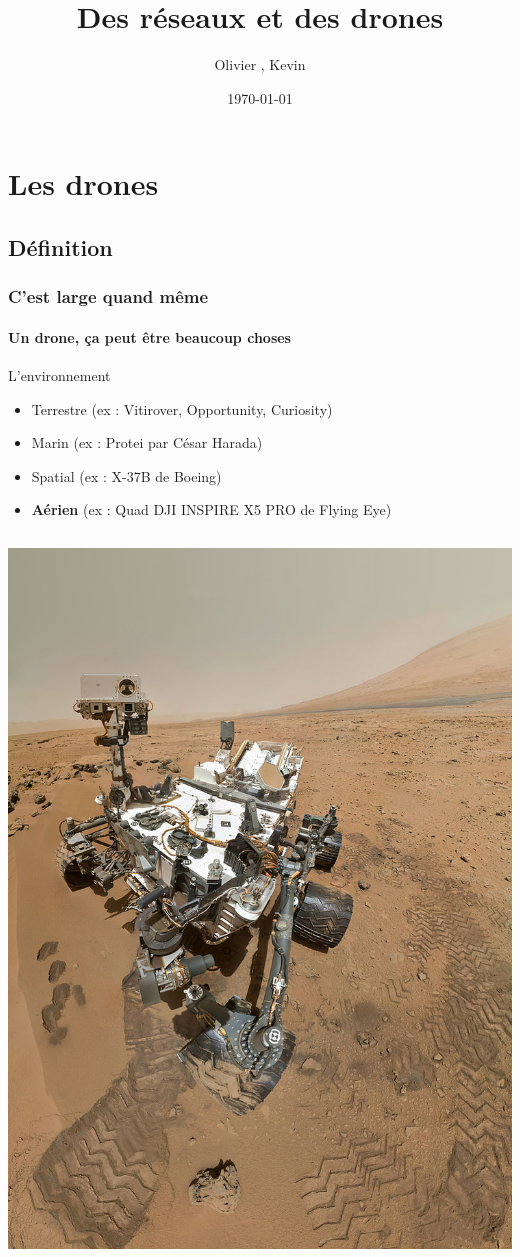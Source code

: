 \documentclass{beamer}
\title{Des réseaux et des drones}
\author{Olivier \bsc{Boissard}, Kevin \bsc{Boulala}}
\institute{Université de Franche Comté}
\date{\today}
\begin{document}
\begin{frame}
  \titlepage
\end{frame}

\begin{frame}
	\tableofcontents[]
\end{frame}

\section{Les drones}
\subsection{Définition}
\begin{frame}
  \frametitle{C'est large quand même}
  \framesubtitle{Un drone, ça peut être beaucoup choses}
  \begin{block}{L'environnement}
    \begin{itemize}
      \item Terrestre (ex : Vitirover, Opportunity, Curiosity)
      \item Marin (ex : Protei par César Harada)
      \item Spatial (ex : X-37B de Boeing)
      \item \textbf{Aérien} (ex : Quad DJI INSPIRE X5 PRO de Flying Eye)
    \end{itemize}
  \end{block}
  \begin{columns}
    \begin{column}{.25\textwidth}
      \includegraphics[width=\textwidth]{../Images/Curiosity.jpg}

\end{column}
\end{columns}
\end{frame}
\end{document}
